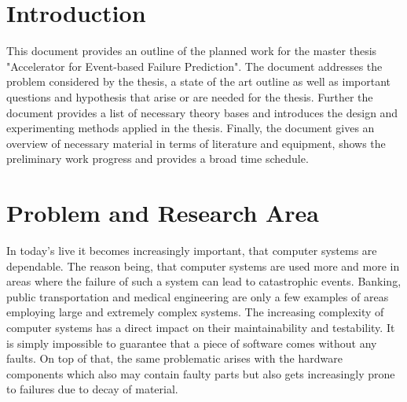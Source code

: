 \documentclass[12pt]{article} %
\begin{document}

\tableofcontents %

\newpage %


\section{Introduction} %

This document provides an outline of the planned work for the master thesis
"Accelerator for Event-based Failure Prediction". The document addresses the
problem considered by the thesis, a state of the art outline as well as
important questions and hypothesis that arise or are needed for the thesis.
Further the document provides a list of necessary theory bases and introduces
the design and experimenting methods applied in the thesis. Finally, the
document gives an overview of necessary material in terms of literature and
equipment, shows the preliminary work progress and provides a broad time
schedule.


\section{Problem and Research Area} %

In today's live it becomes increasingly important, that computer systems are
dependable. The reason being, that computer systems are used more and more in
areas where the failure of such a system can lead to catastrophic events.
Banking, public transportation and medical engineering are only a few examples
of areas employing large and extremely complex systems. The increasing
complexity of computer systems has a direct impact on their maintainability and
testability. It is simply impossible to guarantee that a piece of software comes
without any faults. On top of that, the same problematic arises with the
hardware components which also may contain faulty parts but also gets
increasingly prone to failures due to decay of material.
\end{document}
